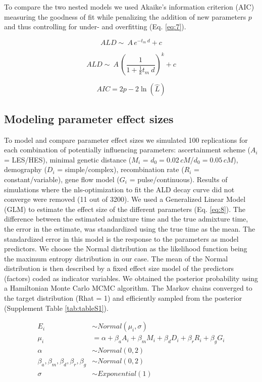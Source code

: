 \documentclass[]{article}
\begin{document}
To compare the two nested models we used Akaike's information criterion
(AIC) measuring the goodness of fit while penalizing the addition of new
parameters \(p\) and thus controlling for under- and overfitting (Eq.
\ref{eq:7}).

\begin{equation}
\label{eq:5}
ALD \sim\ A\,e^{-t_m \:d}+c
\end{equation}

\begin{equation}
\label{eq:6}
ALD \sim\ A\,\left( \frac{1}{1 + \frac{1}{k}t_m \:d}\right) ^k+c
\end{equation}

\begin{equation}
\label{eq:7}
AIC = 2p - 2\ln(\hat{L})
\end{equation}

\subsection{Modeling parameter effect sizes}\label{modeling prameter effect sizes}

To model and compare parameter effect sizes we simulated 100
replications for each combination of potentially influencing
parameters: ascertainment scheme ($A_i$ = LES/HES), minimal genetic distance
($M_i$ = \(d_{0}=0.02\,cM\)/\(d_{0}=0.05\,cM\)), demography ($D_i$ = simple/complex),
recombination rate ($R_i$ = constant/variable), gene flow model
($G_i$ = pulse/continuous). Results of simulations where the nls-optimization to
fit the ALD decay curve did not converge were removed (11 out of 3200).
We used a Generalized Linear Model (GLM)  to estimate the effect
size of the different parameters (Eq.
\ref{eq:8}). The difference between the estimated
admixture time and the true admixture time, the error in the estimate,
was standardized using the true time as the mean. The standardized error in this model is the response to the parameters as model
predictors. We choose the Normal distribution as the likelihood function being the maximum entropy distribution in our case. The mean of the Normal distribution is then described by a fixed effect size model of the predictors (factors) coded as indicator variables. We obtained the posterior probability using a Hamiltonian Monte Carlo MCMC algorithm. The Markov chains converged to the target distribution (Rhat = 1) and efficiently sampled from the posterior (Supplement Table \ref{tab:tableS1}).  

\begin{equation}\label{eq:8}
\begin{split}
E_i &\sim Normal(\mu_i,\sigma) \\
\mu_i &= \alpha + \beta_aA_i + \beta_mM_i + \beta_dD_i + \beta_rR_i + \beta_gG_i \\
\alpha &\sim Normal(0,2) \\
\beta_a,\beta_m,\beta_d,\beta_r,\beta_g &\sim Normal(0,2) \\
\sigma &\sim Exponential(1)
\end{split}
\end{equation}
\end{document}
